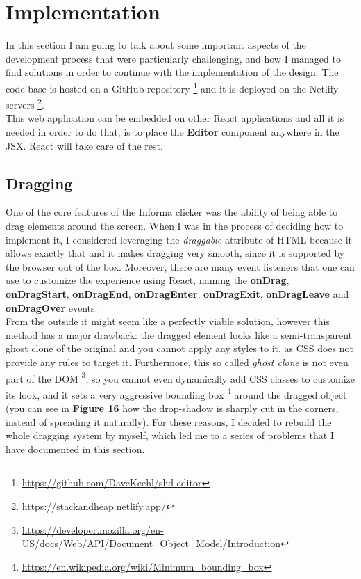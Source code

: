 \documentclass[]{usiinfbachelorproject}
\begin{document}
\vspace{\fill}

\pagebreak

\section{Implementation} \label{implementation}

In this section I am going to talk about some important aspects of the development process that were particularly challenging, and how I managed to find solutions in order to continue with the implementation of the design. The code base is hosted on a GitHub repository \footnote{\url{https://github.com/DaveKeehl/shd-editor}} and it is deployed on the Netlify servers \footnote{\url{https://stackandheap.netlify.app/}}.\\
\noindent This web application can be embedded on other React applications and all it is needed in order to do that, is to place the \textbf{Editor} component anywhere in the JSX. React will take care of the rest.

\subsection{Dragging}

One of the core features of the Informa clicker was the ability of being able to drag elements around the screen. When I was in the process of deciding how to implement it, I considered leveraging the \emph{draggable} attribute of HTML because it allows exactly that and it makes dragging very smooth, since it is supported by the browser out of the box. Moreover, there are many event listeners that one can use to customize the experience using React, naming the \textbf{onDrag}, \textbf{onDragStart}, \textbf{onDragEnd}, \textbf{onDragEnter}, \textbf{onDragExit}, \textbf{onDragLeave} and \textbf{onDragOver} events.\\
From the outside it might seem like a perfectly viable solution, however this method has a major drawback: the dragged element looks like a semi-transparent ghost clone of the original and you cannot apply any styles to it, as CSS does not provide any rules to target it. Furthermore, this so called \emph{ghost clone} is not even part of the DOM \footnote{\url{https://developer.mozilla.org/en-US/docs/Web/API/Document_Object_Model/Introduction}}, so you cannot even dynamically add CSS classes to customize its look, and it sets a very aggressive bounding box \footnote{\url{https://en.wikipedia.org/wiki/Minimum_bounding_box}} around the dragged object (you can see in \textbf{Figure 16} how the drop-shadow is sharply cut in the corners, instead of spreading it naturally).
For these reasons, I decided to rebuild the whole dragging system by myself, which led me to a series of problems that I have documented in this section.
 
\end{document}
